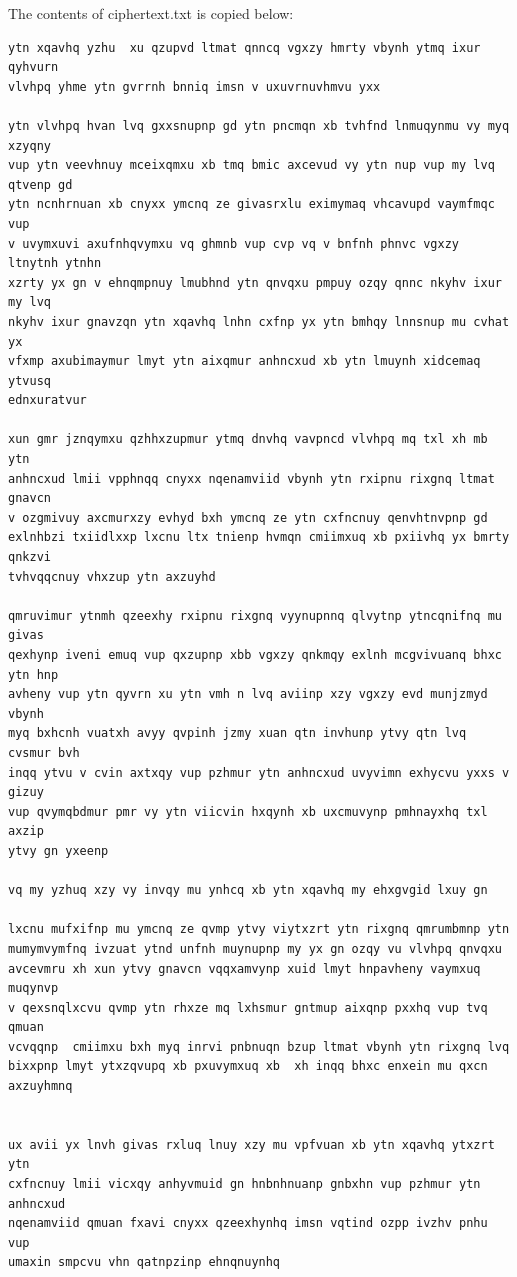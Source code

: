 \documentclass[12pt]{article}
\begin{document}
The contents of ciphertext.txt is copied below:
\begin{verbatim}
ytn xqavhq yzhu  xu qzupvd ltmat qnncq vgxzy hmrty vbynh ytmq ixur qyhvurn
vlvhpq yhme ytn gvrrnh bnniq imsn v uxuvrnuvhmvu yxx

ytn vlvhpq hvan lvq gxxsnupnp gd ytn pncmqn xb tvhfnd lnmuqynmu vy myq xzyqny
vup ytn veevhnuy mceixqmxu xb tmq bmic axcevud vy ytn nup vup my lvq qtvenp gd
ytn ncnhrnuan xb cnyxx ymcnq ze givasrxlu eximymaq vhcavupd vaymfmqc vup
v uvymxuvi axufnhqvymxu vq ghmnb vup cvp vq v bnfnh phnvc vgxzy ltnytnh ytnhn
xzrty yx gn v ehnqmpnuy lmubhnd ytn qnvqxu pmpuy ozqy qnnc nkyhv ixur my lvq
nkyhv ixur gnavzqn ytn xqavhq lnhn cxfnp yx ytn bmhqy lnnsnup mu cvhat yx
vfxmp axubimaymur lmyt ytn aixqmur anhncxud xb ytn lmuynh xidcemaq ytvusq
ednxuratvur

xun gmr jznqymxu qzhhxzupmur ytmq dnvhq vavpncd vlvhpq mq txl xh mb ytn
anhncxud lmii vpphnqq cnyxx nqenamviid vbynh ytn rxipnu rixgnq ltmat gnavcn
v ozgmivuy axcmurxzy evhyd bxh ymcnq ze ytn cxfncnuy qenvhtnvpnp gd 
exlnhbzi txiidlxxp lxcnu ltx tnienp hvmqn cmiimxuq xb pxiivhq yx bmrty qnkzvi
tvhvqqcnuy vhxzup ytn axzuyhd

qmruvimur ytnmh qzeexhy rxipnu rixgnq vyynupnnq qlvytnp ytncqnifnq mu givas
qexhynp iveni emuq vup qxzupnp xbb vgxzy qnkmqy exlnh mcgvivuanq bhxc ytn hnp
avheny vup ytn qyvrn xu ytn vmh n lvq aviinp xzy vgxzy evd munjzmyd vbynh
myq bxhcnh vuatxh avyy qvpinh jzmy xuan qtn invhunp ytvy qtn lvq cvsmur bvh
inqq ytvu v cvin axtxqy vup pzhmur ytn anhncxud uvyvimn exhycvu yxxs v gizuy
vup qvymqbdmur pmr vy ytn viicvin hxqynh xb uxcmuvynp pmhnayxhq txl axzip
ytvy gn yxeenp

vq my yzhuq xzy vy invqy mu ynhcq xb ytn xqavhq my ehxgvgid lxuy gn

lxcnu mufxifnp mu ymcnq ze qvmp ytvy viytxzrt ytn rixgnq qmrumbmnp ytn
mumymvymfnq ivzuat ytnd unfnh muynupnp my yx gn ozqy vu vlvhpq qnvqxu
avcevmru xh xun ytvy gnavcn vqqxamvynp xuid lmyt hnpavheny vaymxuq muqynvp
v qexsnqlxcvu qvmp ytn rhxze mq lxhsmur gntmup aixqnp pxxhq vup tvq qmuan
vcvqqnp  cmiimxu bxh myq inrvi pnbnuqn bzup ltmat vbynh ytn rixgnq lvq
bixxpnp lmyt ytxzqvupq xb pxuvymxuq xb  xh inqq bhxc enxein mu qxcn 
axzuyhmnq


ux avii yx lnvh givas rxluq lnuy xzy mu vpfvuan xb ytn xqavhq ytxzrt ytn
cxfncnuy lmii vicxqy anhyvmuid gn hnbnhnuanp gnbxhn vup pzhmur ytn anhncxud 
nqenamviid qmuan fxavi cnyxx qzeexhynhq imsn vqtind ozpp ivzhv pnhu vup
umaxin smpcvu vhn qatnpzinp ehnqnuynhq


\end{verbatim}
\end{document}
